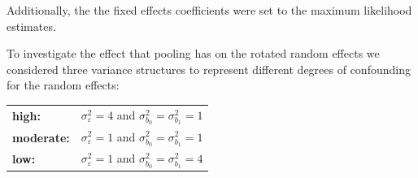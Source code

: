 \documentclass[12pt]{article} %
\newcommand{\hh}[1]{{\color{orange} #1}}
\newcommand{\al}[1]{{\color{red} #1}}
\begin{document}
%
%

Additionally, the the fixed effects coefficients were set to the maximum likelihood estimates.

To investigate the effect that pooling has on the rotated random effects we considered  three variance structures \al{to represent different degrees of confounding for the random effects}:\\
%
\begin{tabular}{ll}
\textbf{high:} & $\sigma^2_\varepsilon = 4$ and  $\sigma^2_{b_0} = \sigma^2_{b_1} = 1$ \\
\textbf{moderate:} & $\sigma^2_\varepsilon = 1$ and  $\sigma^2_{b_0} = \sigma^2_{b_1} = 1$ \\
\textbf{low:} & $\sigma^2_\varepsilon = 1$ and  $\sigma^2_{b_0} = \sigma^2_{b_1} = 4$ \\
\end{tabular}
%
\end{document}
